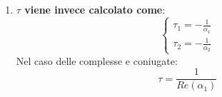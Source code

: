 \documentclass[../main.tex]{subfiles}
\begin{document}
\begin{enumerate}
\begin{itemize}
$${\begin{cases}
						x(0^+)=A + x(\infty) \\
						\frac{d \; x(0^+)}{dt} = K \cdot A + Q \cdot B
				\end{cases}}$$
				$$\begin{cases} 
					x(0^+)=A \cdot \sin(B) + x(\infty) \\
					\frac{d \; x(0^+)}{dt} = \frac{d \; A \cdot \sin(B)}{dt}
				\end{cases}$$
			\end{itemize}
		\item \textbf{$\tau$ viene invece calcolato come}:
			$$\begin{cases} 
				\tau_1 = -\frac{1}{\alpha_1} \\
				\tau_2 = -\frac{1}{\alpha_2}
			\end{cases}$$
			Nel caso delle complesse e coniugate:
			$$ \tau = \frac{1}{Re(\alpha_1)}$$
	\end{enumerate}
\end{document}
